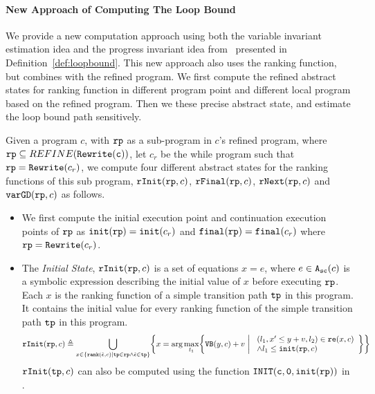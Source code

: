 \paragraph{New Approach of Computing The Loop Bound} 
We provide a new computation approach using both the variable invariant estimation idea and the progress invariant idea from~\cite{GulwaniJK09} presented in Definition~\ref{def:loopbound}.
This new approach also uses the ranking function, but combines with the refined program.
We first compute the refined abstract states for ranking function in different program point and different local program based on the refined program.
Then we these precise abstract state, and estimate the loop bound path sensitively.

\begin{defn}
  \label{def:alg-absstate}
  Given a program $c$, with $\mathtt{rp}$ as a sub-program in $c$'s refined program, where $\mathtt{rp} \subseteq REFINE(\mathtt{Rewrite(c)})$, let $c_r$ be the while program such that $\mathtt{rp} = \mathtt{Rewrite}(c_r)$,
  we compute four different abstract states for the ranking functions of this sub program, 
  $\mathtt{rInit}(\mathtt{rp}, c)$, $\mathtt{rFinal}(\mathtt{rp}, c)$, $\mathtt{rNext}(\mathtt{rp}, c)$ and $\mathtt{varGD}(\mathtt{rp}, c)$ as follows.
 \begin{itemize}
  \item We first compute the initial execution point and continuation execution points of $\mathtt{rp}$ as
  $\mathtt{init}(\mathtt{rp}) = \mathtt{init}(c_r)$
  and 
  $\mathtt{final}(\mathtt{rp}) = \mathtt{final}(c_r)$ where $\mathtt{rp} = \mathtt{Rewrite}(c_r)$.
  \item The \emph{Initial State}, 
  $\mathtt{rInit}(\mathtt{rp}, c)$ is a set of equations $x = e$, where $e \in {\ensuremath{\mathtt{A_{sc}}}}(c)$ is a
  symbolic expression describing the initial value of $x$ before executing $\mathtt{rp}$.
  Each $x$ is the ranking function of a simple transition path $\mathtt{tp}$ in this program. 
  It contains the initial value for every ranking function of the simple transition path $\mathtt{tp}$ in this program.
 \[
   \rfinit(\rprog, c) \triangleq 
   \bigcup_{x \in \left\{ \locbound(\absevent, c) | \tpath \in \rprog \land \absevent \in \tpath \right\} }
   \left \{ 
   x = \arg\max_{l_1}\left\{
     \varinvar(y, c) + v ~\middle\vert~ 
     \begin{array}{l} 
       (l_1, x' \leq y + v, l_2) \in \reset(x, c) 
       \\
     \land l_1 \leq \absinit(\rprog, c)
   \end{array}
   \right\}
   \right\}
   \]
 $\mathtt{rInit}(\mathtt{tp}, c)$ can also be computed using the function $\mathtt{INIT(c, 0, \mathtt{init}(\mathtt{rp}))}$ in \cite{GulwaniJK09}. 

\end{itemize}
\end{defn}
